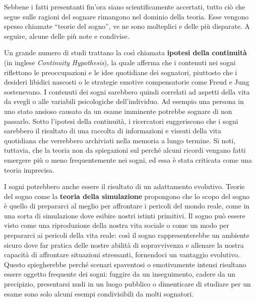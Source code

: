 Sebbene i fatti presentanti fin'ora siano scientificamente accertati, tutto ciò che segue sulle ragioni del
sognare rimangono nel dominio della teoria.
Esse vengono spesso chiamate ``teorie del sogno'', ve ne sono molteplici e delle più disparate.
A seguire, alcune delle più note e condivise.


Un grande numero di studi trattano la così chiamata \textbf{ipotesi della continuità} (in inglese
\textit{Continuity Hypothesis}), la quale afferma che i contenuti nei sogni riflettono le preoccupazioni
e le idee quotidiane dei sognatori, piuttosto che i desideri libidici nascosti o le strategie emotive compensatorie
come Freud e Jung sostenevano.
I contenuti dei sogni sarebbero quindi correlati ad aspetti della vita da svegli o alle variabili psicologiche
dell'individuo.
Ad esempio una persona in uno stato ansioso causato da un esame imminente potrebbe sognare di non passarlo.
Sotto l'ipotesi della continuità, i ricercatori suggeriscono che i sogni sarebbero il risultato di una raccolta di
informazioni e vissuti della vita quotidiana che verrebbero archiviati nella memoria a lungo termine.
Si noti, tuttavia, che la teoria non da spiegazioni sul perché alcuni ricordi vengano
fatti emergere più o meno frequentemente nei sogni, ed essa è stata criticata come una teoria imprecisa.


I sogni potrebbero anche essere il risultato di un adattamento evolutivo.
Teorie del sogno come la \textbf{teoria della simulazione} propongono che lo scopo del sogno è quello di prepararci
al meglio per affrontare i pericoli del mondo reale, come in una sorta di simulazione dove esibire nostri istinti
primitivi.
Il sogno può essere visto come una riproduzione della nostra vita sociale o come un modo per prepararci ai pericoli
della vita reale: così il sogno rappresenterebbe un ambiente sicuro dove far pratica delle nostre
abilità di sopravvivenza e allenare la nostra capacità di affrontare situazioni stressanti, fornendoci un vantaggio
evolutivo.
Questo spiegherebbe perché scenari spaventosi o emotivamente intensi risultano essere oggetto frequente dei sogni:
fuggire da un inseguimento, cadere da un precipizio, presentarsi nudi in un luogo pubblico o dimenticare di studiare
per un esame sono solo alcuni esempi condivisibili da molti sognatori.


